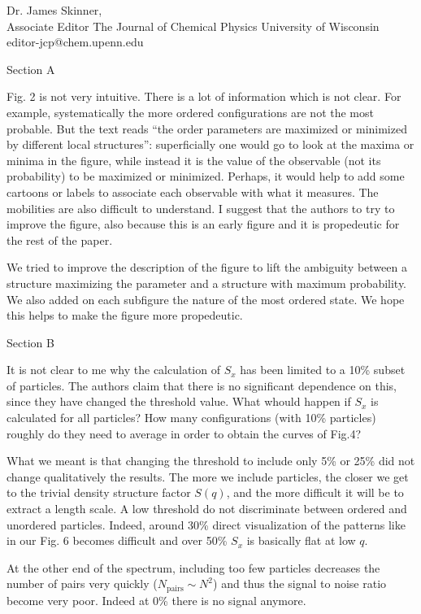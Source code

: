 \documentclass[a4paper, rebuttal, parskip=true, firsthead=false, fromemail=false, foldmarks=false]{scrlttr2}
\begin{document}
\begin{letter}{Dr. James Skinner,\\Associate Editor
The Journal of Chemical Physics
University of Wisconsin\\
editor-jcp@chem.upenn.edu }
\begin{quotationi}
Section A

Fig. 2 is not very intuitive. There is a lot of information which is not clear. For example, systematically the more ordered configurations are not the most probable. But the text reads ``the order parameters are maximized or minimized by different local structures'': superficially one would go to look at the maxima or minima in the figure, while instead it is the value of the observable (not its probability) to be maximized or minimized. Perhaps, it would help to add some cartoons or labels to associate each observable with what it measures. The mobilities are also difficult to understand. I suggest that the authors to try to improve the figure, also because this is an early figure and it is propedeutic for the rest of the paper.
\end{quotationi}

We tried to improve the description of the figure to lift the ambiguity between a structure maximizing the parameter and a structure with maximum probability. We also added on each subfigure the nature of the most ordered state. We hope this helps to make the figure more propedeutic.

\begin{quotationi}
Section B

It is not clear to me why the calculation of $S_x$ has been limited to a 10\% subset of particles. The authors claim that there is no significant dependence on this, since they have changed the threshold value. What whould happen if $S_x$ is calculated for all particles? How many configurations (with 10\% particles) roughly do they need to average in order to obtain the curves of Fig.4?
\end{quotationi}

What we meant is that changing the threshold to include only 5\% or 25\% did not change qualitatively the results. The more we include particles, the closer we get to the trivial density structure factor $S(q)$, and the more difficult it will be to extract a length scale. A low threshold do not discriminate between ordered and unordered particles. Indeed, around 30\% direct visualization of the patterns like in our Fig. 6 becomes difficult and over 50\% $S_x$ is basically flat at low $q$. 

At the other end of the spectrum, including too few particles decreases the number of pairs very quickly ($N_\text{pairs}\sim N^2$) and thus the signal to noise ratio become very poor. Indeed at 0\% there is no signal anymore.


\end{letter}
\end{document}
